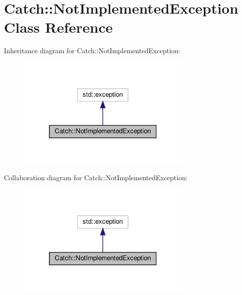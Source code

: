 \hypertarget{classCatch_1_1NotImplementedException}{}\section{Catch\+:\+:Not\+Implemented\+Exception Class Reference}
\label{classCatch_1_1NotImplementedException}


Inheritance diagram for Catch\+:\+:Not\+Implemented\+Exception\+:\nopagebreak
\begin{figure}[H]
\begin{center}
\leavevmode
\includegraphics[width=244pt]{classCatch_1_1NotImplementedException__inherit__graph}
\end{center}
\end{figure}


Collaboration diagram for Catch\+:\+:Not\+Implemented\+Exception\+:\nopagebreak
\begin{figure}[H]
\begin{center}
\leavevmode
\includegraphics[width=244pt]{classCatch_1_1NotImplementedException__coll__graph}
\end{center}
\end{figure}
